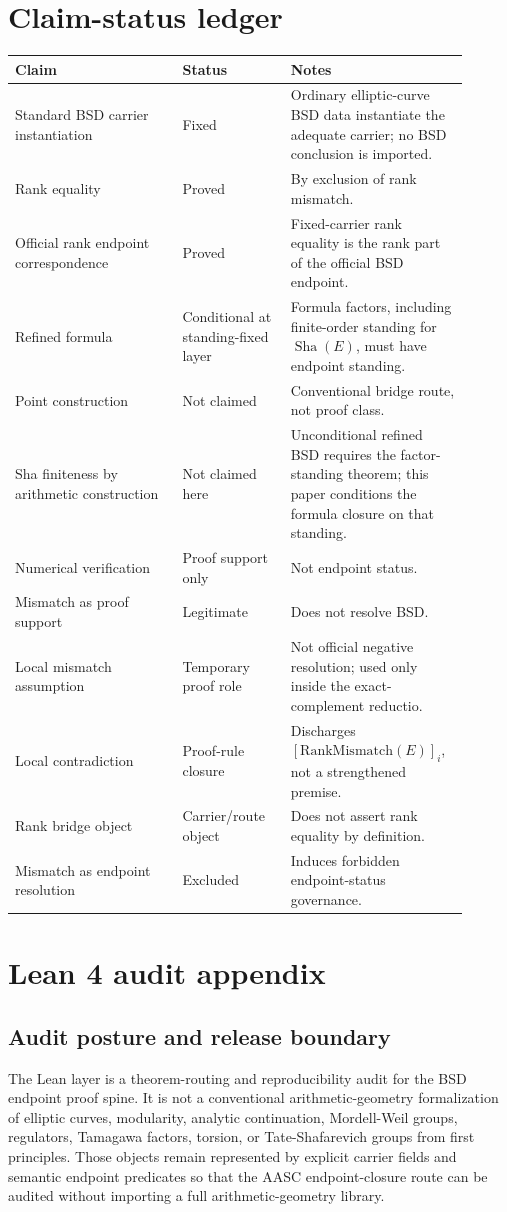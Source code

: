 \documentclass[11pt]{article}
\newcommand{\Sha}{\operatorname{Sha}}
\newcommand{\RankMismatch}{\mathrm{RankMismatch}}
\begin{document}
\section{Claim-status ledger}
\begin{longtable}{L{0.34\linewidth}L{0.22\linewidth}L{0.34\linewidth}}
\toprule
\textbf{Claim} & \textbf{Status} & \textbf{Notes}\\
\midrule
Standard BSD carrier instantiation & Fixed & Ordinary elliptic-curve BSD data instantiate the adequate carrier; no BSD conclusion is imported.\\
Rank equality & Proved & By exclusion of rank mismatch.\\
Official rank endpoint correspondence & Proved & Fixed-carrier rank equality is the rank part of the official BSD endpoint.\\
Refined formula & Conditional at standing-fixed layer & Formula factors, including finite-order standing for $\Sha(E)$, must have endpoint standing.\\
Point construction & Not claimed & Conventional bridge route, not proof class.\\
Sha finiteness by arithmetic construction & Not claimed here & Unconditional refined BSD requires the factor-standing theorem; this paper conditions the formula closure on that standing.\\
Numerical verification & Proof support only & Not endpoint status.\\
Mismatch as proof support & Legitimate & Does not resolve BSD.\\
Local mismatch assumption & Temporary proof role & Not official negative resolution; used only inside the exact-complement reductio.\\
Local contradiction & Proof-rule closure & Discharges $[\RankMismatch(E)]_i$, not a strengthened premise.\\
Rank bridge object & Carrier/route object & Does not assert rank equality by definition.\\
Mismatch as endpoint resolution & Excluded & Induces forbidden endpoint-status governance.\\
\bottomrule
\end{longtable}


\section{Lean 4 audit appendix}

\subsection{Audit posture and release boundary}
The Lean layer is a theorem-routing and reproducibility audit for the BSD endpoint proof spine. It is not a conventional arithmetic-geometry formalization of elliptic curves, modularity, analytic continuation, Mordell-Weil groups, regulators, Tamagawa factors, torsion, or Tate-Shafarevich groups from first principles. Those objects remain represented by explicit carrier fields and semantic endpoint predicates so that the AASC endpoint-closure route can be audited without importing a full arithmetic-geometry library.
\end{document}
